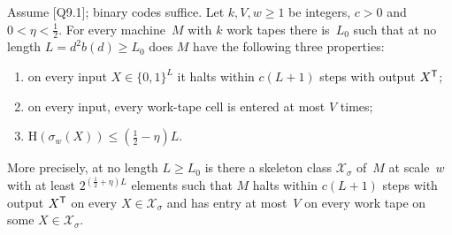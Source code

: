 \begin{theorem}\label{thm:SE}
Assume [Q9.1]; binary codes suffice. Let $k,V,w\ge1$ be integers, $c>0$ and $0<\eta<\frac12$. For every machine~$M$
with $k$ work tapes there is~$L_0$ such that at no length $L=d^2b(d)\ge L_0$ does $M$ have the following three
properties:
\begin{enumerate}[label=(\roman*)]
\item on every input $X\in\{0,1\}^L$ it halts within $c(L+1)$ steps with output $X^{\mathsf{T}}$;
\item on every input, every work-tape cell is entered at most $V$ times;
\item $\mathrm H(\sigma_w(X))\le(\frac12-\eta)L$.
\end{enumerate}
More precisely, at no length $L\ge L_0$ is there a skeleton class $\mathcal X_\sigma$ of~$M$ at scale~$w$ with at least
$2^{(\frac12+\eta)L}$ elements such that $M$ halts within $c(L+1)$ steps with output $X^{\mathsf{T}}$ on every
$X\in\mathcal X_\sigma$ and has entry at most~$V$ on every work tape on some $X\in\mathcal X_\sigma$.
\end{theorem}

